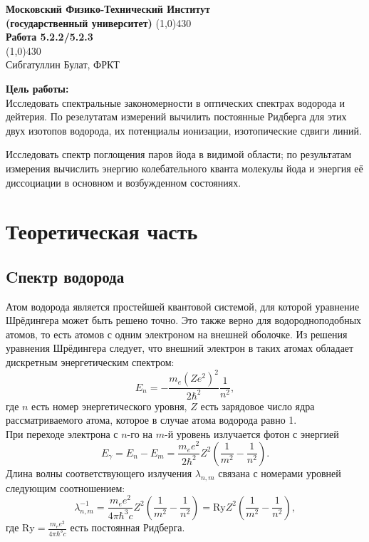 \documentclass[a4paper, 12pt]{article}%
\begin{document}
\begin{titlepage}

\begin{center}
\large\textbf{Московский Физико-Технический Институт}\\
\large\textbf{(государственный университет)}
\vfill
\line(1,0){430}\\[1mm]
\huge\textbf{Работа 5.2.2/5.2.3}\\
\line(1,0){430}\\[1mm]
\vfill
\large Сибгатуллин Булат, ФРКТ\\
\end{center}

\end{titlepage}
\noindent \textbf{Цель работы:} \\
\indent Исследовать спектральные закономерности в оптических спектрах водорода и дейтерия. По резелутатам измерений вычилить постоянные Ридберга для этих двух изотопов водорода, их потенциалы ионизации, изотопические сдвиги линий.
	
	Исследовать спектр поглощения паров йода в видимой области; по результатам измерения вычислить энергию колебательного кванта молекулы йода и энергия её диссоциации в основном и возбужденном состояниях.

\section{Теоретическая часть}
\subsection{Cпектр водорода}
Атом водорода является простейшей квантовой системой, для которой уравнение Шрёдингера может быть решено точно. Это также верно для водородноподобных атомов, то есть атомов с одним электроном на внешней оболочке. Из решения уравнения Шрёдингера следует, что внешний электрон в таких атомах обладает дискретным энергетическим спектром:  
\begin{equation}
	E_n = - \frac{m_e (Z e^2)^2}{2\hbar^2}\frac{1}{n^2},
\end{equation}
где $n$ есть номер энергетического уровня, $Z$ есть зарядовое число ядра рассматриваемого атома, которое в случае атома водорода равно 1.\\
При переходе электрона с $n$-го на $m$-й уровень излучается фотон с энергией
\begin{equation}
	E_\gamma = E_n - E_m = \frac{m_ee^2}{2\hbar^2}Z^2\left(\frac{1}{m^2} - \frac{1}{n^2}\right).
\end{equation}
Длина волны  соответствующего излучения $\lambda_{n,m}$ связана с номерами уровней следующим соотношением:
\begin{equation}
	\label{eq:Ry}
	\lambda_{n,m}^{-1} =\frac{m_ee^2}{4\pi\hbar^3c}Z^2\left(\frac{1}{m^2}-\frac{1}{n^2}\right) = \text{Ry} Z^2 \left(\frac{1}{m^2}-\frac{1}{n^2}\right),
\end{equation}
где $\text{Ry} = \frac{m_ee^2}{4\pi\hbar^3c}$ есть постоянная Ридберга.
\end{document}
